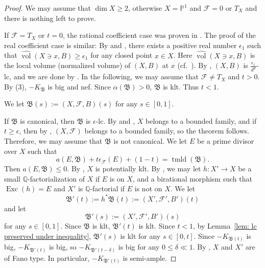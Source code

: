 \documentclass[11pt,reqno]{amsart}
\numberwithin{equation}{section}
\newcommand{\nvol}{\widehat{\operatorname{vol}}}
\newcommand{\Exc}{\operatorname{Exc}}
\newcommand{\tmld}{{\operatorname{tmld}}}
\newcommand{\Bb}{{\mathfrak{B}}}
\newcommand{\Ff}{\mathcal{F}}
\theoremstyle{definition}
\begin{document}
\begin{proof}
We may assume that $\dim X\geq 2$, otherwise $X=\mathbb P^1$ and $\Ff=0$ or $T_X$ and there is nothing left to prove.

If $\Ff=T_X$ or $t=0$, the rational coefficient case was proven in \cite[Corollary~6.14]{LLX20}. The proof of the real coefficient case is similar: By \cite[Lemma~2.13]{XZ24} and \cite[Corollary~1.4]{XZ21}, there exists a positive real number $\epsilon_1$ such that $\nvol(X\ni x,B)\geq\epsilon_1$ for any closed point $x\in X$. Here $\nvol(X\ni x,B)$ is the local volume (normalized volume) of $(X,B)$ at $x$ (cf.~\cite{Li18,LLX20}). By \cite[Theorem~6.13]{LLX20}, $(X,B)$ is $\frac{\epsilon_1}{d^d}$-lc, and we are done by \cite[Theorem~1.1]{Bir21a}. In the following, we may assume that $\Ff\neq T_X$ and $t>0$. By (3), $-K_{\Bb}$ is big and nef. Since $\alpha(\Bb)>0$, $\Bb$ is klt. Thus $t<1$.

We let $\Bb(s):=(X,\Ff,B)(s)$ for any $s\in [0,1]$.

If $\Bb$ is canonical, then $\Bb$ is $\epsilon$-lc. By \cite[Theorem~9.2]{Cas+25a} and \cite[Corollary~1.4]{Bir21a}, $X$ belongs to a bounded family, and if $t\geq\epsilon$, then by \cite[Theorem~2.4.1]{Cas+25a}, $(X,\Ff)$ belongs to a bounded family, so the theorem follows. Therefore, we may assume that $\Bb$ is not canonical. We let $E$ be a prime divisor over $X$ such that
$$a(E,\Bb)+t\epsilon_{\Ff}(E)+(1-t)=\tmld(\Bb).$$
Then $a(E,\Bb)\leq 0$. By \cite[Theorem~1.10(1)]{Cas+24}, $X$ is potentially klt. By \cite[Theorem~2.2.3]{Cas+25a}, we may let $h\colon X'\rightarrow X$ be a small $\mathbb Q$-factorialization of $X$ if $E$ is on $X$, and a birational morphism such that $\Exc(h)=E$ and $X'$ is $\mathbb Q$-factorial if $E$ is not on $X$. We let
$$\Bb'(t):=h^*\Bb(t):=(X',\Ff',B')(t)$$
and let 
$$\Bb'(s):=(X',\Ff',B')(s)$$
for any $s\in [0,1]$. Since $\Bb$ is klt, $\Bb'(t)$ is klt. Since $t<1$, by Lemma~\ref{lem: lc preserved under inequality}, $\Bb'(s)$ is klt for any $s\in [0,t]$. Since $-K_{\Bb(t)}$ is big, $-K_{\Bb'(t)}$ is big, so $-K_{\Bb'(t-\delta)}$ is big for any $0\leq\delta\ll 1$. By \cite[Theorem~9.2]{Cas+25a}, $X$ and $X'$ are of Fano type. In particular, $-K_{\Bb'(t)}$ is semi-ample. 


\end{proof}
\end{document}
